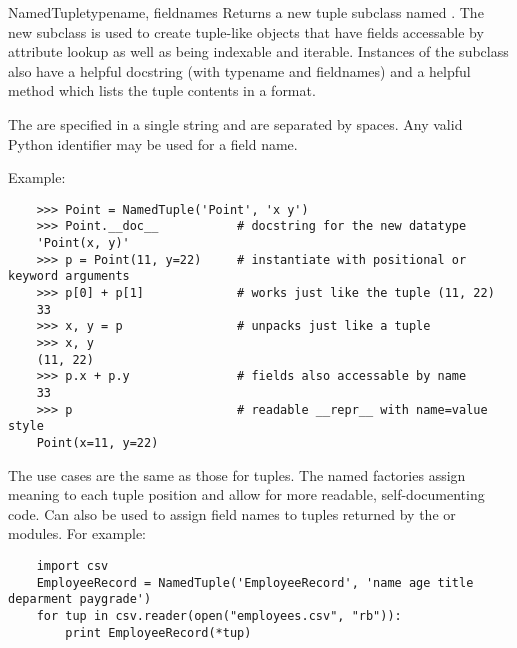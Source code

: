 \begin{funcdesc}{NamedTuple}{typename, fieldnames}
  Returns a new tuple subclass named .  The new subclass is used
  to create tuple-like objects that have fields accessable by attribute
  lookup as well as being indexable and iterable.  Instances of the subclass
  also have a helpful docstring (with typename and fieldnames) and a helpful
   method which lists the tuple contents in a 
  format.

  The  are specified in a single string and are separated by spaces.
  Any valid Python identifier may be used for a field name.

  Example:
  \begin{verbatim}
    >>> Point = NamedTuple('Point', 'x y')
    >>> Point.__doc__           # docstring for the new datatype
    'Point(x, y)'
    >>> p = Point(11, y=22)     # instantiate with positional or keyword arguments
    >>> p[0] + p[1]             # works just like the tuple (11, 22)
    33
    >>> x, y = p                # unpacks just like a tuple
    >>> x, y
    (11, 22)
    >>> p.x + p.y               # fields also accessable by name
    33
    >>> p                       # readable __repr__ with name=value style
    Point(x=11, y=22)  
  \end{verbatim}

  The use cases are the same as those for tuples.  The named factories
  assign meaning to each tuple position and allow for more readable,
  self-documenting code.  Can also be used to assign field names to tuples
  returned by the  or  modules.  For example:

  \begin{verbatim}
    import csv
    EmployeeRecord = NamedTuple('EmployeeRecord', 'name age title deparment paygrade')
    for tup in csv.reader(open("employees.csv", "rb")):
        print EmployeeRecord(*tup)
  \end{verbatim}

\end{funcdesc}
